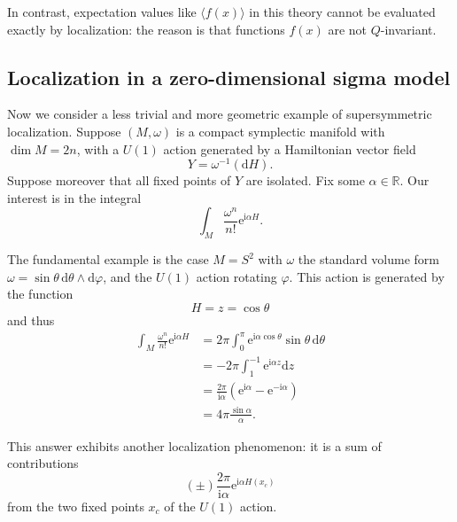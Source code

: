 \documentclass[12pt,letterpaper,reqno]{article}
\numberwithin{equation}{section}
\newcommand{\R}{\ensuremath{\mathbb R}}
\newcommand{\I}{{\mathrm i}}
\newcommand{\e}{{\mathrm e}}
\newcommand{\de}{\mathrm{d}}
\newcommand{\IP}[1]{\langle#1\rangle}
\newcommand{\fixme}[1]{{\color{orange}{[#1]}}}
\begin{document}
\fixme{study the cancellation in perturbation theory?}

In contrast, expectation values like $\IP{f(x)}$ 
in this theory cannot be evaluated
exactly by localization: the reason is that
functions $f(x)$ are not
$Q$-invariant.


\subsection{Localization in a zero-dimensional sigma model}

Now we consider a less trivial and more geometric example of supersymmetric
localization.
Suppose $(M, \omega)$ is a compact symplectic manifold with
$\dim M = 2n$, with a $U(1)$ action
generated by a Hamiltonian vector field
\begin{equation}
  Y = \omega^{-1}(\de H).
\end{equation}
Suppose moreover that all fixed points of $Y$ are isolated.
Fix some $\alpha \in \R$.
Our interest is in the integral
\begin{equation} \label{eq:dh-integral}
  \int_M \frac{\omega^n}{n!} \e^{\I \alpha H}. 
\end{equation}
\begin{example}
The fundamental example is the case $M = S^2$ with $\omega$ the standard
volume form $\omega = \sin \theta \, \de \theta \wedge \de \varphi$,
and the $U(1)$ action rotating $\varphi$. This action is generated
by the function
\begin{equation}
  H = z = \cos \theta
\end{equation}
and thus
\begin{align}
  \int_M \frac{\omega^n}{n!} \e^{\I \alpha H} &= 2 \pi \int_0^\pi \e^{\I \alpha \cos \theta} \sin \theta \, \de \theta \\
  &= -2 \pi \int_{1}^{-1} \e^{\I \alpha z} \de z \\
  &= \frac{2\pi}{\I \alpha} (\e^{\I \alpha} - \e^{-\I \alpha}) \\
  &= 4 \pi \frac{\sin \alpha}{\alpha}.
\end{align}
\end{example}
This answer exhibits another localization
phenomenon: it is a sum of contributions 
\begin{equation} \label{eq:S2-critical-contrib}
(\pm) \frac{2\pi}{\I \alpha} \e^{\I \alpha H(x_c)}
\end{equation}
from the two fixed points $x_c$ of 
the $U(1)$ action. 

\end{document}
